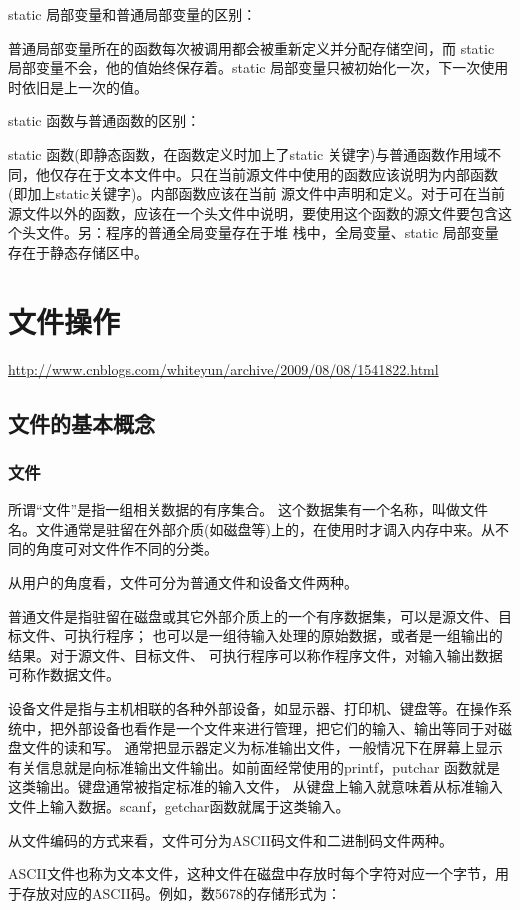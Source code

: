 static 局部变量和普通局部变量的区别：

普通局部变量所在的函数每次被调用都会被重新定义并分配存储空间，而 static 局部变量不会，他的值始终保存着。static 局部变量只被初始化一次，下一次使用时依旧是上一次的值。

static 函数与普通函数的区别：

static 函数(即静态函数，在函数定义时加上了static 关键字)与普通函数作用域不同，他仅存在于文本文件中。只在当前源文件中使用的函数应该说明为内部函数(即加上static关键字)。内部函数应该在当前 源文件中声明和定义。对于可在当前源文件以外的函数，应该在一个头文件中说明，要使用这个函数的源文件要包含这个头文件。另：程序的普通全局变量存在于堆 栈中，全局变量、static 局部变量存在于静态存储区中。



\section{文件操作}
\url{http://www.cnblogs.com/whiteyun/archive/2009/08/08/1541822.html}
\subsection{文件的基本概念}
\subsubsection{文件}
所谓“文件”是指一组相关数据的有序集合。 这个数据集有一个名称，叫做文件名。文件通常是驻留在外部介质(如磁盘等)上的，在使用时才调入内存中来。从不同的角度可对文件作不同的分类。

从用户的角度看，文件可分为普通文件和设备文件两种。

普通文件是指驻留在磁盘或其它外部介质上的一个有序数据集，可以是源文件、目标文件、可执行程序； 也可以是一组待输入处理的原始数据，或者是一组输出的结果。对于源文件、目标文件、 可执行程序可以称作程序文件，对输入输出数据可称作数据文件。

设备文件是指与主机相联的各种外部设备，如显示器、打印机、键盘等。在操作系统中，把外部设备也看作是一个文件来进行管理，把它们的输入、输出等同于对磁盘文件的读和写。 通常把显示器定义为标准输出文件，一般情况下在屏幕上显示有关信息就是向标准输出文件输出。如前面经常使用的printf，putchar 函数就是这类输出。键盘通常被指定标准的输入文件， 从键盘上输入就意味着从标准输入文件上输入数据。scanf，getchar函数就属于这类输入。

从文件编码的方式来看，文件可分为ASCII码文件和二进制码文件两种。

ASCII文件也称为文本文件，这种文件在磁盘中存放时每个字符对应一个字节，用于存放对应的ASCII码。例如，数5678的存储形式为：

